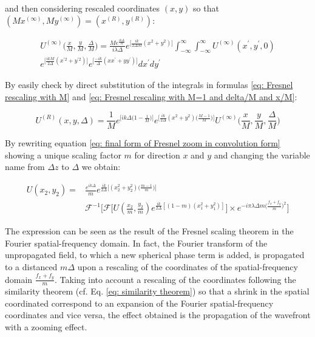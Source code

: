 \documentclass{iucr}              %
\begin{document}
and then considering rescaled coordinates $(x,y)$ so that $(Mx^{(\infty)},My^{(\infty)}) = (x^{(R)},y^{(R)})$:

 \begin{multline}\label{eq: Fresnel rescaling with M=1 and delta/M and x/M}
 U^{(\infty)}\Big(\frac{x}{M}, \frac{y}{M}, \frac{\Delta}{M}\Big)=\frac {Me^{\frac{ik\Delta}{M}}}{ i \lambda \Delta} e^{\big[\frac{ik}{2\Delta M}(x^2+y^2)\big]} \int_{-\infty}^{\infty} \int_{-\infty}^{\infty} U^{(\infty)}(x^\prime, y^\prime, 0)\\
 e^{\big[\frac{ikM}{2\Delta}(x^{\prime 2}+y^{\prime 2})\big]}e^{\big[\frac{-ik}{\Delta}(xx^{\prime}+yy^{\prime})\big]} dx^\prime dy^\prime
 \end{multline}

By easily check by direct substitution of the integrals in formulas \ref{eq: Fresnel rescaling with M} and \ref{eq: Fresnel rescaling with M=1 and delta/M and x/M}:

\begin{equation}
	U^{(R)}(x, y, \Delta)= \frac{1}{M} e^{\big[ik\Delta \big({1-\frac{1}{M}}\big)\big]} e^{\big[\frac{ik}{2\Delta}(x^2+y^2)\big(\frac{M-1}{M}\big)\big]} U^{(\infty)}\Big(\frac{x}{M}, \frac{y}{M}, \frac{\Delta}{M}\Big)
\end{equation}

By rewriting equation \ref{eq: final form of Fresnel zoom in convolution form} showing a unique scaling factor $m$ for direction $x$ and $y$ and changing the variable name from $\Delta z$ to $\Delta$ we obtain:

\begin{equation}
	\begin{aligned}
	U(x_2, y_2) = &\frac { e^{ik\Delta}}{m} e^{\frac{ik}{2 \Delta} \big[(x_2^2 + y_2^2)\big(\frac{m - 1}{m}\big)\big]}\\ &\mathcal{F}^{-1}\Big[\mathcal{F}\big[U(\frac{x_2}{m}, \frac{y_2}{m})e^{\frac{ik}{2 \Delta } [(1-m)(x_1^2+y_1^2)]}\big]\times e^{-i \pi \lambda \Delta m \big(\frac{f_x+f_y}{m}\big)^2 }\Big]
	\end{aligned}
\end{equation}

The expression can be seen as the result of the Fresnel scaling theorem in the Fourier spatial-frequency domain. In fact, the Fourier transform of the unpropagated field, to which a new spherical phase term is added, is propagated to a distanced $m\Delta$ upon a rescaling of the coordinates of the spatial-frequency domain $\frac{f_x+f_y}{m}$. Taking into account a rescaling of the coordinates following the similarity theorem (cf. Eq. \ref{eq: similarity theorem}) so that a shrink in the spatial coordinated correspond to an expansion of the Fourier spatial-frequency coordinates and vice versa, the effect obtained is the propagation of the wavefront with a zooming effect.
\end{document}
